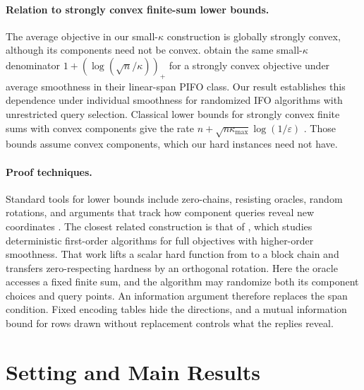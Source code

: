 \documentclass{article}
\theoremstyle{definition}
\begin{document}
\paragraph{Relation to strongly convex finite-sum lower bounds.}
The average objective in our small-$\kappa$ construction is
globally strongly convex, although its components need not be convex.
\citet[Theorem~66]{han2024lower} obtain the same small-$\kappa$ denominator
$1+(\log(\sqrt n/\kappa))_+$ for a strongly convex objective under average
smoothness in their linear-span PIFO class.  Our result establishes this
dependence under individual smoothness for randomized IFO algorithms with
unrestricted query selection.  Classical lower bounds for strongly convex
finite sums with convex components give the rate
$n+\sqrt{n\kappa_{\max}}\log(1/\varepsilon)$
\citep{agarwal2015lower,woodworth2016tight,lan2018optimal,allenzhu2017katyusha}.
Those bounds assume convex components, which our hard instances need not have.

\paragraph{Proof techniques.}
Standard tools for lower bounds include zero-chains, resisting oracles, random
rotations, and arguments that track how component queries reveal new coordinates
\citep{nemirovski1983problem,nesterov2018lectures,agarwal2015lower,woodworth2016tight,carmon2020lower1,carmon2021lower2}.
The closest related construction is that of \citet{zhou2026sharp}, which studies
deterministic first-order algorithms for full objectives with higher-order
smoothness.  That work lifts a scalar hard function from
\citet{carmon2020lower1,carmon2021lower2} to a block chain and transfers
zero-respecting hardness by an orthogonal rotation.  Here the oracle accesses a
fixed finite sum, and the algorithm may randomize both its component choices and
query points.  An information argument therefore replaces the span condition.
Fixed encoding tables hide the directions, and a mutual information bound for
rows drawn without replacement controls what the replies reveal.

\section{Setting and Main Results}
\label{sec:setting}
\end{document}
